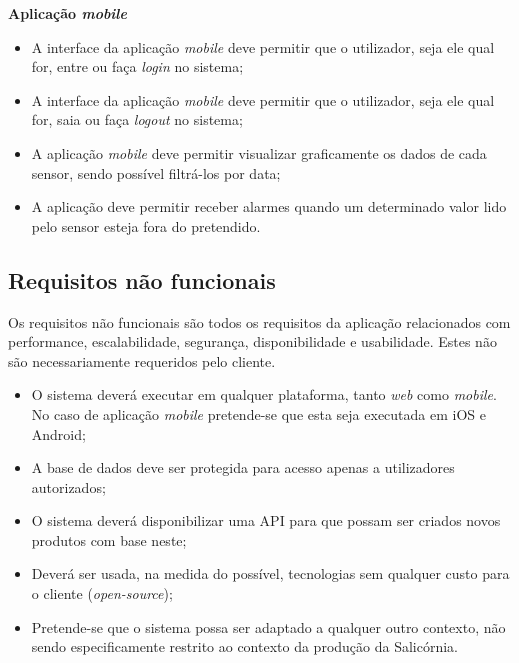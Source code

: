 \textbf{Aplicação \textit{mobile}}



\begin{itemize}
	\item A interface da aplicação \textit{mobile} deve permitir que o utilizador, seja ele qual for, entre ou faça \textit{login} no sistema; 
	
	\item A interface da aplicação \textit{mobile} deve permitir que o utilizador, seja ele qual for, saia ou faça \textit{logout} no sistema;
	
	
	\item A aplicação \textit{mobile} deve permitir visualizar graficamente os dados de cada sensor, sendo possível filtrá-los por data;
	
	\item  A aplicação deve permitir receber alarmes quando um determinado valor lido pelo sensor esteja fora do pretendido.
	
	
\end{itemize}

\subsection{Requisitos não funcionais}

Os requisitos não funcionais são todos os requisitos da aplicação relacionados com performance, escalabilidade, segurança, disponibilidade e usabilidade. Estes não são necessariamente requeridos pelo cliente. 


\begin{itemize}
	\item O sistema deverá executar em qualquer plataforma, tanto \textit{web} como \textit{mobile}. No caso de aplicação \textit{mobile} pretende-se que esta seja executada em iOS e Android;  
	
	
	\item A base de dados deve ser protegida para acesso apenas a utilizadores autorizados; 
	
	
	\item O sistema deverá disponibilizar uma \ac{API} para que possam ser criados novos produtos com base neste;  
	
	\item Deverá ser usada, na medida do possível, tecnologias sem qualquer custo para o cliente (\textit{open-source}); 
	
	\item Pretende-se que o sistema possa ser adaptado a qualquer outro contexto, não sendo especificamente restrito ao contexto da produção da Salicórnia.  
	
\end{itemize}

